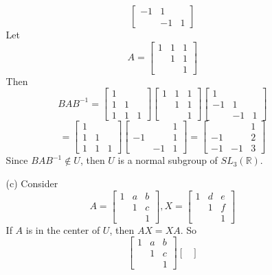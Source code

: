 \documentclass[12pt]{article}
\begin{document}
\begin{itemize}
\begin{itemize}
$$\begin{bmatrix}
-1 & 1 \\
& -1 & 1
\end{bmatrix}$$
Let
$$A = \begin{bmatrix}
1 & 1 & 1 \\
& 1 & 1 \\
& & 1
\end{bmatrix}$$
Then
$$BAB^{-1} = \begin{bmatrix}
1 \\
1 & 1 \\
1 & 1 & 1
\end{bmatrix}\begin{bmatrix}
1 & 1 & 1 \\
& 1 & 1 \\
& & 1
\end{bmatrix}\begin{bmatrix}
1 & \\
-1 & 1 \\
& -1 & 1
\end{bmatrix}$$
$$= \begin{bmatrix}
1 \\
1 & 1 \\
1 & 1 & 1
\end{bmatrix}\begin{bmatrix}
& & 1 \\
-1 & & 1 \\
& -1 & 1
\end{bmatrix} = \begin{bmatrix}
& & 1 \\
-1 & & 2 \\
-1 & -1 & 3
\end{bmatrix}$$
Since $BAB^{-1} \not \in U$, then $U$ is a normal subgroup of $SL_3(\mathbb{R})$.
\item[(c)]
Consider
$$A = \begin{bmatrix}
1 & a & b \\
& 1 & c \\
& & 1
\end{bmatrix}, X = \begin{bmatrix}
1 & d & e \\
& 1 & f \\
& & 1
\end{bmatrix}$$
If $A$ is in the center of $U$, then $AX = XA$. So
$$\begin{bmatrix}
1 & a & b \\
& 1 & c \\
& & 1
\end{bmatrix}\begin{bmatrix}

\end{bmatrix}$$
\end{itemize}
\end{itemize}
\end{document}
